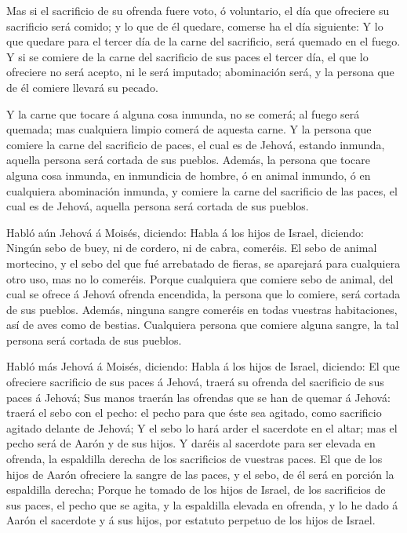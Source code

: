  Mas si el sacrificio de su ofrenda fuere voto, ó
voluntario, el día que ofreciere su sacrificio será comido; y lo que de
él quedare, comerse ha el día siguiente:  Y lo que quedare
para el tercer día de la carne del sacrificio, será quemado en el fuego.
 Y si se comiere de la carne del sacrificio de sus paces el
tercer día, el que lo ofreciere no será acepto, ni le será imputado;
abominación será, y la persona que de él comiere llevará su pecado.

 Y la carne que tocare á alguna cosa inmunda, no se comerá;
al fuego será quemada; mas cualquiera limpio comerá de aquesta carne.
 Y la persona que comiere la carne del sacrificio de paces,
el cual es de Jehová, estando inmunda, aquella persona será cortada de
sus pueblos.  Además, la persona que tocare alguna cosa
inmunda, en inmundicia de hombre, ó en animal inmundo, ó en cualquiera
abominación inmunda, y comiere la carne del sacrificio de las paces, el
cual es de Jehová, aquella persona será cortada de sus pueblos.

 Habló aún Jehová á Moisés, diciendo:  Habla á
los hijos de Israel, diciendo: Ningún sebo de buey, ni de cordero, ni de
cabra, comeréis.  El sebo de animal mortecino, y el sebo
del que fué arrebatado de fieras, se aparejará para cualquiera otro uso,
mas no lo comeréis.  Porque cualquiera que comiere sebo de
animal, del cual se ofrece á Jehová ofrenda encendida, la persona que lo
comiere, será cortada de sus pueblos.  Además, ninguna
sangre comeréis en todas vuestras habitaciones, así de aves como de
bestias.  Cualquiera persona que comiere alguna sangre, la
tal persona será cortada de sus pueblos.

 Habló más Jehová á Moisés, diciendo:  Habla á
los hijos de Israel, diciendo: El que ofreciere sacrificio de sus paces
á Jehová, traerá su ofrenda del sacrificio de sus paces á Jehová;
 Sus manos traerán las ofrendas que se han de quemar á
Jehová: traerá el sebo con el pecho: el pecho para que éste sea agitado,
como sacrificio agitado delante de Jehová;  Y el sebo lo
hará arder el sacerdote en el altar; mas el pecho será de Aarón y de sus
hijos.  Y daréis al sacerdote para ser elevada en ofrenda,
la espaldilla derecha de los sacrificios de vuestras paces.
 El que de los hijos de Aarón ofreciere la sangre de las
paces, y el sebo, de él será en porción la espaldilla derecha;
 Porque he tomado de los hijos de Israel, de los
sacrificios de sus paces, el pecho que se agita, y la espaldilla elevada
en ofrenda, y lo he dado á Aarón el sacerdote y á sus hijos, por
estatuto perpetuo de los hijos de Israel.

